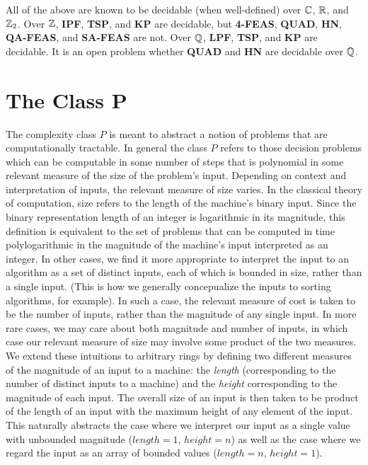 \documentclass[twoside]{article}
\begin{document}
  All of the above are known to be decidable (when well-defined) over
  $\mathbb{C}$, $\mathbb{R}$, and $\mathbb{Z}_2$.  Over $\mathbb{Z}$,
  \textbf{IPF}, \textbf{TSP}, and \textbf{KP} are decidable, but
  \textbf{4-FEAS}, \textbf{QUAD}, \textbf{HN}, \textbf{QA-FEAS}, and
  \textbf{SA-FEAS} are not.  Over $\mathbb{Q}$, \textbf{LPF},
  \textbf{TSP}, and \textbf{KP} are decidable.  It is an open problem
  whether \textbf{QUAD} and \textbf{HN} are decidable over $\mathbb{Q}$.

  \section{The Class P}

The complexity class $P$ is meant to abstract a notion of problems
that are computationally tractable.  In general the class $P$ refers
to those decision problems which can be computable in some number of
steps that is polynomial in some relevant measure of the size of the
problem's input.  Depending on context and interpretation of inputs,
the relevant measure of size varies. In the classical theory of
computation, size refers to the length of the machine's binary input.
Since the binary representation length of an integer is logarithmic in
its magnitude, this definition is equivalent to the set of problems
that can be computed in time polylogarithmic in the magnitude of the
machine's input interpreted as an integer.  In other cases, we find it
more appropriate to interpret the input to an algorithm as a set of
distinct inputs, each of which is bounded in size, rather than a
single input.  (This is how we generally concepualize the inputs to
sorting algorithms, for example).  In such a case, the relevant
measure of cost is taken to be the number of inputs, rather than the
magnitude of any single input.  In more rare cases, we may care about
both magnitude and number of inputs, in which case our relevant measure
of size may involve some product of the two measures.\\

We extend these intuitions to arbitrary rings by defining two
different measures of the magnitude of an input to a machine: the
\emph{length} (corresponding to the number of distinct inputs to a
machine) and the \emph{height} corresponding to the magnitude of each
input.  The overall size of an input is then taken to be product of
the length of an input with the maximum height of any element of the
input.  This naturally abstracts the case where we interpret our input
as a single value with unbounded magnitude ($length = 1$, $height =
n$) as well as the case where we regard the input as an array of
bounded values ($length = n$, $height = 1$).
\end{document}
